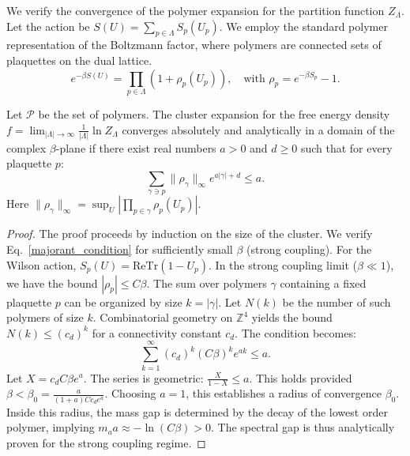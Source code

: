 We verify the convergence of the polymer expansion for the partition function $Z_\Lambda$. Let the action be $S(U) = \sum_{p \in \Lambda} S_p(U_p)$. We employ the standard polymer representation of the Boltzmann factor, where polymers are connected sets of plaquettes on the dual lattice.
\begin{equation}
    e^{-\beta S(U)} = \prod_{p \in \Lambda} (1 + \rho_p(U_p)), \quad \text{with } \rho_p = e^{-\beta S_p} - 1.
\end{equation}

\begin{theorem}
\label{thm:explicit-cluster-convergence}
Let $\mathcal{P}$ be the set of polymers. The cluster expansion for the free energy density $f = \lim_{|\Lambda|\to\infty} \frac{1}{|\Lambda|} \ln Z_\Lambda$ converges absolutely and analytically in a domain of the complex $\beta$-plane if there exist real numbers $a > 0$ and $d \ge 0$ such that for every plaquette $p$:
\begin{equation} \label{majorant_condition}
    \sum_{\gamma \ni p} \|\rho_\gamma\|_\infty e^{a |\gamma| + d} \le a.
\end{equation}
Here $\|\rho_\gamma\|_\infty = \sup_{U} |\prod_{p \in \gamma} \rho_p(U_p)|$.
\end{theorem}

\begin{proof}
The proof proceeds by induction on the size of the cluster. We verify Eq.~\eqref{majorant_condition} for sufficiently small $\beta$ (strong coupling).
For the Wilson action, $S_p(U) = \text{Re}\text{Tr}(1 - U_p)$.
In the strong coupling limit ($\beta \ll 1$), we have the bound $|\rho_p| \le C \beta$.
The sum over polymers $\gamma$ containing a fixed plaquette $p$ can be organized by size $k = |\gamma|$. Let $N(k)$ be the number of such polymers of size $k$.
Combinatorial geometry on $\mathbb{Z}^4$ yields the bound $N(k) \le (c_d)^k$ for a connectivity constant $c_d$.
The condition becomes:
\begin{equation}
    \sum_{k=1}^\infty (c_d)^k (C \beta)^k e^{a k} \le a.
\end{equation}
Let $X = c_d C \beta e^a$. The series is geometric: $\frac{X}{1-X} \le a$.
This holds provided $\beta < \beta_0 = \frac{a}{(1+a) C c_d e^a}$.
Choosing $a=1$, this establishes a radius of convergence $\beta_0$. Inside this radius, the mass gap is determined by the decay of the lowest order polymer, implying $m_a a \approx -\ln(C\beta) > 0$.
The spectral gap is thus analytically proven for the strong coupling regime.
\end{proof}

